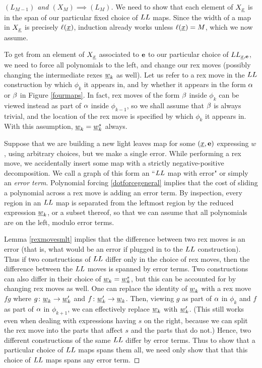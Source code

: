 \begin{proof}[$(L_{M-1})$ and $(X_M) \implies (L_M)$] We need to show that each element of $X_{\underline{x}}$ is in the span of our particular fixed choice of $LL$ maps. Since the width of a map in
$X_{\underline{x}}$ is precisely $\ell({\underline{x}})$, induction already works unless $\ell({\underline{x}})=M$, which we now assume.

To get from an element of $X_{\underline{x}}$ associated to ${\mathbf e}$ to our particular choice of $LL_{{\underline{x}},{\mathbf e}}$, we need to force all polynomials to the left, and change our rex moves (possibly changing
the intermediate rexes ${\underline{w}}_k$ as well). Let us refer to a rex move in the $LL$ construction by which $\phi_k$ it appears in, and by whether it appears in the form $\alpha$ or $\beta$ in Figure
\ref{fourmaps}. In fact, rex moves of the form $\beta$ inside $\phi_k$ can be viewed instead as part of $\alpha$ inside $\phi_{k-1}$, so we shall assume that $\beta$ is always trivial, and the
location of the rex move is specified by which $\phi_k$ it appears in. With this assumption, ${\underline{w}}_k = {\underline{w}}^s_k$ always.

Suppose that we are building a new light leaves map for some $({\underline{x}},{\mathbf e})$ expressing $w$, using arbitrary choices, but we make a single error. While performing a rex move, we
accidentally insert some map with a strictly negative-positive decomposition. We call a graph of this form an ``$LL$ map with error" or simply an \emph{error term}. Polynomial forcing
\eqref{dotforcegeneral} implies that the cost of sliding a polynomial across a rex move is adding an error term. By inspection, every region in an $LL$ map is separated from the leftmost
region by the reduced expression ${\underline{w}}_k$, or a subset thereof, so that we can assume that all polynomials are on the left, modulo error terms.

Lemma \ref{rexmovesmlt} implies that the difference between two rex moves is an error (that is, what would be an error if plugged in to the $LL$ construction). Thus if two constructions
of $LL$ differ only in the choice of rex moves, then the difference between the $LL$ moves is spanned by error terms. Two constructions can also differ in their choice of ${\underline{w}}_k =
{\underline{w}}^s_k$, but this can be accounted for by changing rex moves as well. One can replace the identity of ${\underline{w}}_k$ with a rex move $fg$ where $g \colon {\underline{w}}_k \rightarrow {\underline{w}}'_k$ and $f \colon {\underline{w}}'_k \rightarrow
{\underline{w}}_k$. Then, viewing $g$ as part of $\alpha$ in $\phi_k$ and $f$ as part of $\alpha$ in $\phi_{k+1}$, we can effectively replace ${\underline{w}}_k$ with ${\underline{w}}'_k$. (This still works even when dealing with
expressions having $s$ on the right, because we can split the rex move into the parts that affect $s$ and the parts that do not.) Hence, two different constructions of the same $LL$
differ by error terms. Thus to show that a particular choice of $LL$ maps spans them all, we need only show that that this choice of $LL$ maps spans any error term.


\end{proof}
